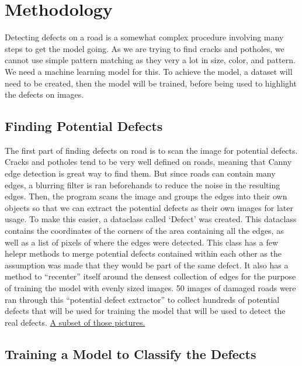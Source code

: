\documentclass[12pt, letterpaper, twoside]{article}
\begin{document}
\section{Methodology}
\label{sec:meth}

Detecting defects on a road is a somewhat complex procedure involving many steps to get the model going. 
As we are trying to find cracks and potholes, we cannot use simple pattern matching as they very a lot in size, color, and pattern.
We need a machine learning model for this.
To achieve the model, a dataset will need to be created, then the model will be trained, before being used to highlight the defects on images.

\subsection{Finding Potential Defects}
\label{sec:meth:1}

The first part of finding defects on road is to scan the image for potential defects. 
Cracks and potholes tend to be very well defined on roads, meaning that Canny edge detection is great way to find them.
But since roads can contain many edges, a blurring filter is ran beforehands to reduce the noise in the resulting edges.
Then, the program scans the image and groups the edges into their own objects so that we can extract the potential defects as their own images for later usage.
To make this easier, a dataclass called `Defect' was created.
This dataclass contains the coordinates of the corners of the area containing all the edges, as well as a list of pixels of where the edges were detected.
This class has a few helepr methods to merge potential defects contained within each other as the assumption was made that they would be part of the same defect.
It also has a method to ``recenter'' itself around the densest collection of edges for the purpose of training the model with evenly sized images.
50 images of damaged roads were ran through this ``potential defect extractor'' to collect hundreds of potential defects that will be used for training the model that will be used to detect the real defects.
\hyperref[app:train_data]{A subset of those pictures.}

\subsection{Training a Model to Classify the Defects}
\end{document}
